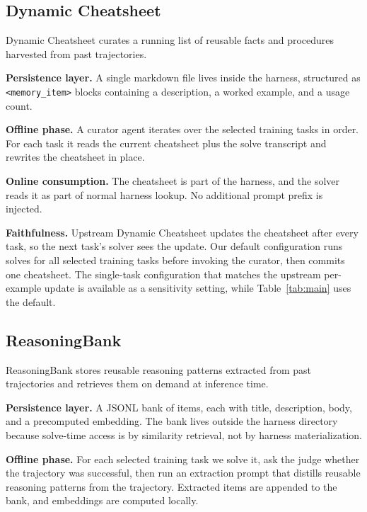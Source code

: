 \documentclass{llmxive}
\begin{document}
\subsection{Dynamic Cheatsheet \citep{suzgun2025dynamiccheatsheet}}

Dynamic Cheatsheet curates a running list of reusable facts and procedures harvested from past trajectories.

\noindent\textbf{Persistence layer.}
A single markdown file lives inside the harness, structured as \texttt{<memory\_item>} blocks containing a description, a worked example, and a usage count.

\noindent\textbf{Offline phase.}
A curator agent iterates over the selected training tasks in order.
For each task it reads the current cheatsheet plus the solve transcript and rewrites the cheatsheet in place.

\noindent\textbf{Online consumption.}
The cheatsheet is part of the harness, and the solver reads it as part of normal harness lookup.
No additional prompt prefix is injected.

\noindent\textbf{Faithfulness.}
Upstream Dynamic Cheatsheet updates the cheatsheet after every task, so the next task's solver sees the update.
Our default configuration runs solves for all selected training tasks before invoking the curator, then commits one cheatsheet.
The single-task configuration that matches the upstream per-example update is available as a sensitivity setting, while Table~\ref{tab:main} uses the default.

\subsection{ReasoningBank \citep{ouyang2026reasoningbank}}

ReasoningBank stores reusable reasoning patterns extracted from past trajectories and retrieves them on demand at inference time.

\noindent\textbf{Persistence layer.}
A JSONL bank of items, each with title, description, body, and a precomputed embedding.
The bank lives outside the harness directory because solve-time access is by similarity retrieval, not by harness materialization.

\noindent\textbf{Offline phase.}
For each selected training task we solve it, ask the judge whether the trajectory was successful, then run an extraction prompt that distills reusable reasoning patterns from the trajectory.
Extracted items are appended to the bank, and embeddings are computed locally.
\end{document}
